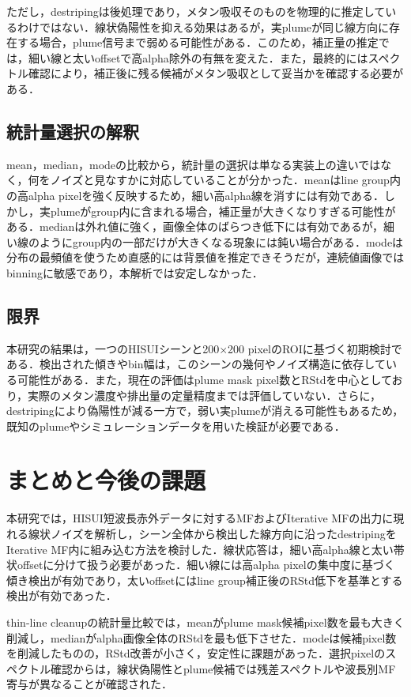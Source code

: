 \documentclass[a4paper,10pt]{ltjsarticle}
\begin{document}
ただし，destripingは後処理であり，メタン吸収そのものを物理的に推定しているわけではない．線状偽陽性を抑える効果はあるが，実plumeが同じ線方向に存在する場合，plume信号まで弱める可能性がある．このため，補正量の推定では，細い線と太いoffsetで高alpha除外の有無を変えた．また，最終的にはスペクトル確認により，補正後に残る候補がメタン吸収として妥当かを確認する必要がある．

\subsection{統計量選択の解釈}
mean，median，modeの比較から，統計量の選択は単なる実装上の違いではなく，何をノイズと見なすかに対応していることが分かった．meanはline group内の高alpha pixelを強く反映するため，細い高alpha線を消すには有効である．しかし，実plumeがgroup内に含まれる場合，補正量が大きくなりすぎる可能性がある．medianは外れ値に強く，画像全体のばらつき低下には有効であるが，細い線のようにgroup内の一部だけが大きくなる現象には鈍い場合がある．modeは分布の最頻値を使うため直感的には背景値を推定できそうだが，連続値画像ではbinningに敏感であり，本解析では安定しなかった．

\subsection{限界}
本研究の結果は，一つのHISUIシーンと200$\times$200 pixelのROIに基づく初期検討である．検出された傾きやbin幅は，このシーンの幾何やノイズ構造に依存している可能性がある．また，現在の評価はplume mask pixel数とRStdを中心としており，実際のメタン濃度や排出量の定量精度までは評価していない．さらに，destripingにより偽陽性が減る一方で，弱い実plumeが消える可能性もあるため，既知のplumeやシミュレーションデータを用いた検証が必要である．

\section{まとめと今後の課題}
本研究では，HISUI短波長赤外データに対するMFおよびIterative MFの出力に現れる線状ノイズを解析し，シーン全体から検出した線方向に沿ったdestripingをIterative MF内に組み込む方法を検討した．線状応答は，細い高alpha線と太い帯状offsetに分けて扱う必要があった．細い線には高alpha pixelの集中度に基づく傾き検出が有効であり，太いoffsetにはline group補正後のRStd低下を基準とする検出が有効であった．

thin-line cleanupの統計量比較では，meanがplume mask候補pixel数を最も大きく削減し，medianがalpha画像全体のRStdを最も低下させた．modeは候補pixel数を削減したものの，RStd改善が小さく，安定性に課題があった．選択pixelのスペクトル確認からは，線状偽陽性とplume候補では残差スペクトルや波長別MF寄与が異なることが確認された．
\end{document}
